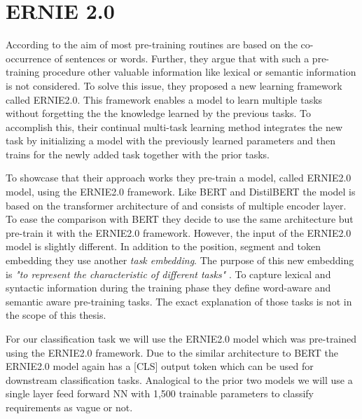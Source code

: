 \section{ERNIE 2.0}
\label{chp:approach:sec:models:subsec:ernie2.0}

According to \textcite{Sun:2019a} the aim of most pre-training routines are based on the co-occurrence of sentences or words.
Further, they argue that with such a pre-training procedure other valuable information like lexical or semantic information is not considered.
To solve this issue, they proposed a new learning framework called \ac{ERNIE2.0}.
This framework enables a model to learn multiple tasks without forgetting the the knowledge learned by the previous tasks.
To accomplish this, their continual multi-task learning method integrates the new task by initializing a model with the previously learned parameters and then trains for the newly added task together with the prior tasks.

To showcase that their approach works they pre-train a model, called \ac{ERNIE2.0} model, using the \ac{ERNIE2.0} framework.
Like \ac{BERT} and \ac{DistilBERT} the model is based on the transformer architecture of \textcite{Vaswani:2017} and consists of multiple encoder layer.
To ease the comparison with \ac{BERT} they decide to use the same architecture but pre-train it with the \ac{ERNIE2.0} framework.
However, the input of the \ac{ERNIE2.0} model is slightly different.
In addition to the position, segment and token embedding they use another \textit{task embedding}.
The purpose of this new embedding is \textit{"to represent the characteristic of different tasks"} \parencite{Sun:2019a}.
To capture lexical and syntactic information during the training phase they define word-aware and semantic aware pre-training tasks.
The exact explanation of those tasks is not in the scope of this thesis. \parencite{Sun:2019a}

For our classification task we will use the \ac{ERNIE2.0} model which was pre-trained using the \ac{ERNIE2.0} framework.
Due to the similar architecture to \ac{BERT} the \ac{ERNIE2.0} model again has a [CLS] output token which can be used for downstream classification tasks.
Analogical to the prior two models we will use a single layer feed forward \ac{NN} with 1,500 trainable parameters to classify requirements as vague or not.
